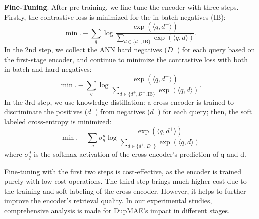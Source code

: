 \documentclass[11pt,a4paper]{article}
\begin{document}
\textbf{Fine-Tuning}. After pre-training, we fine-tune the encoder with three steps. Firstly, the contrastive loss is minimized for the in-batch negatives ($\text{IB}$): 
\begin{equation}\label{eq:15}
    \min. - \sum_{q} \log \frac{\exp(\langle q,d^+ \rangle)}
    {\sum_{d \in \{d^+, \text{IB}\} }\exp(\langle q,d \rangle)}. 
\end{equation}
In the 2nd step, we collect the ANN hard negatives ($D^-$) for each query based on the first-stage encoder, and continue to minimize the contrastive loss with both in-batch and hard negatives: 
\begin{equation}\label{eq:16}
    \min. - \sum_{q} \log \frac{\exp(\langle q,d^+ \rangle)}
    {\sum\nolimits_{d \in \{d^+, D^-, \text{IB} \} }\exp(\langle q,d \rangle)}. 
\end{equation} 
In the 3rd step, we use knowledge distillation: a cross-encoder is trained to discriminate the positives ($d^+$) from negatives ($d^-$) for each query; then, the soft labeled cross-entropy is minimized: 
\begin{equation}\label{eq:17}
    \min. - \sum_q \sigma_q^d \log \frac{\exp(\langle q,d^+ \rangle)}
    {\sum_{d \in \{d^+, D^-\} }\exp(\langle q,d \rangle)}
\end{equation} 
where $\sigma_q^d$ is the softmax activation of the cross-encoder's prediction of q and d. 

Fine-tuning with the first two steps is cost-effective, as the encoder is trained purely with low-cost operations. The third step brings much higher cost due to the training and soft-labeling of the cross-encoder. However, it helps to further improve the encoder's retrieval quality. In our experimental studies, comprehensive analysis is made for DupMAE's impact in different stages. 
\end{document}
